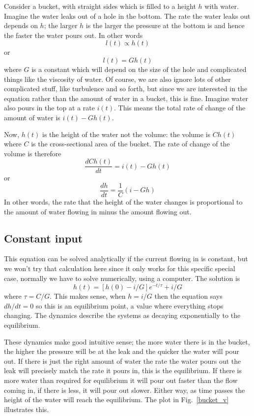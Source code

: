 \documentclass[11pt,a4paper]{scrartcl}
\begin{document}
Consider a bucket, with straight sides which is filled to a height $h$
with water. Imagine the water leaks out of a hole in the bottom. The
rate the water leaks out depends on $h$; the larger $h$ is the larger
the pressure at the bottom is and hence the faster the water pours
out. In other words
\begin{equation}
l(t)\propto h(t)
\end{equation}
or 
\begin{equation}
l(t)= G h(t)
\end{equation}
where $G$ is a constant which will depend on the size of the hole and
complicated things like the viscosity of water. Of course, we are also
ignore lots of other complicated stuff, like turbulence and so forth, but
since we are interested in the equation rather than the amount of
water in a bucket, this is fine. Imagine water also pours in the top
at a rate $i(t)$. This means the total rate of change of the amount of
water is $i(t)-Gh(t)$.

Now, $h(t)$ is the height of the water not the volume: the volume is
$Ch(t)$ where $C$ is the cross-sectional area of the bucket. The rate
of change of the volume is therefore
\begin{equation}
\frac{dCh(t)}{dt}=i(t)-Gh(t)
\end{equation}
or
\begin{equation}
\frac{dh}{dt}=\frac{1}{C}(i-Gh)
\end{equation}
In other words, the rate that the height of the water changes is
proportional to the amount of water flowing in minus the amount
flowing out.

\subsection*{Constant input}

This equation can be solved analytically if the current flowing in is
constant, but we won't try that calculation here since it only works
for this specific special case, normally we have to solve numerically,
using a computer. The solution is
\begin{equation}
h(t)=[h(0)-i/G]e^{-t/\tau}+i/G
\end{equation}
where $\tau=C/G$. This makes sense, when $h=i/G$ then the equation
says $dh/dt=0$ so this is an equilibrium point, a value where
everything stops changing. The dynamics describe the systems as
decaying exponentially to the equilibrium.

These dynamics make good intuitive sense; the more water there is in
the bucket, the higher the pressure will be at the leak and the
quicker the water will pour out. If there is just the right amount of
water the rate the water pours out the leak will precisely match the
rate it pours in, this is the equilibrium. If there is more water than
required for equilibrium it will pour out faster than the flow coming
in, if there is less, it will pour out slower. Either way, as time
passes the height of the water will reach the equilibrium. The plot in
Fig.~\ref{bucket_v} illustrates this.
\end{document}
